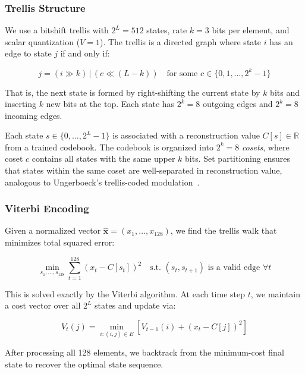\documentclass{article}
\newcommand{\R}{\mathbb{R}}
\begin{document}
\subsubsection{Trellis Structure}

We use a bitshift trellis with $2^L = 512$ states, rate $k = 3$ bits per
element, and scalar quantization ($V = 1$). The trellis is a directed graph
where state $i$ has an edge to state $j$ if and only if:

\begin{equation}
j = (i \gg k) \,|\, (c \ll (L - k))
\quad \text{for some } c \in \{0, 1, \ldots, 2^k - 1\}
\label{eq:transition}
\end{equation}

That is, the next state is formed by right-shifting the current state by $k$
bits and inserting $k$ new bits at the top. Each state has $2^k = 8$ outgoing
edges and $2^k = 8$ incoming edges.

Each state $s \in \{0, \ldots, 2^L - 1\}$ is associated with a reconstruction
value $C[s] \in \R$ from a trained codebook. The codebook is organized into
$2^k = 8$ \emph{cosets}, where coset $c$ contains all states with the same
upper $k$ bits. Set partitioning ensures that states within the same coset are
well-separated in reconstruction value, analogous to Ungerboeck's
trellis-coded modulation~\cite{marcellin1990tcq}.

\subsubsection{Viterbi Encoding}

Given a normalized vector $\hat{\mathbf{x}} = (x_1, \ldots, x_{128})$, we find
the trellis walk that minimizes total squared error:

\begin{equation}
\min_{s_1, \ldots, s_{128}} \sum_{t=1}^{128} (x_t - C[s_t])^2
\quad \text{s.t. } (s_t, s_{t+1}) \text{ is a valid edge } \forall t
\label{eq:viterbi_obj}
\end{equation}

This is solved exactly by the Viterbi algorithm. At each time step $t$, we
maintain a cost vector over all $2^L$ states and update via:

\begin{equation}
V_t(j) = \min_{i : (i,j) \in E} \left[ V_{t-1}(i) + (x_t - C[j])^2 \right]
\end{equation}

After processing all 128 elements, we backtrack from the minimum-cost final
state to recover the optimal state sequence.
\end{document}
